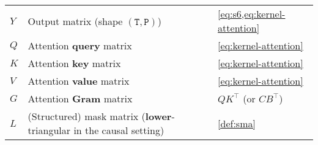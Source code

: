 \begin{table}[!h]
\begin{tabular}{@{}lll@{}}
    $Y$            & Output matrix (shape $\mathtt{(T, P)}$)                                    & \cref{eq:s6,eq:kernel-attention} \\
    $Q$            & Attention \textbf{query} matrix                                            & \cref{eq:kernel-attention} \\
    $K$            & Attention \textbf{key} matrix                                              & \cref{eq:kernel-attention} \\
    $V$            & Attention \textbf{value} matrix                                            & \cref{eq:kernel-attention} \\
    $G$            & Attention \textbf{Gram} matrix                                             & $QK^{\top}$ (or $CB^{\top}$) \\
    $L$            & (Structured) mask matrix (\textbf{lower}-triangular in the causal setting) & \cref{def:sma} \\
    \bottomrule
  \end{tabular}
  \label{tab:glossary}
\end{table}
